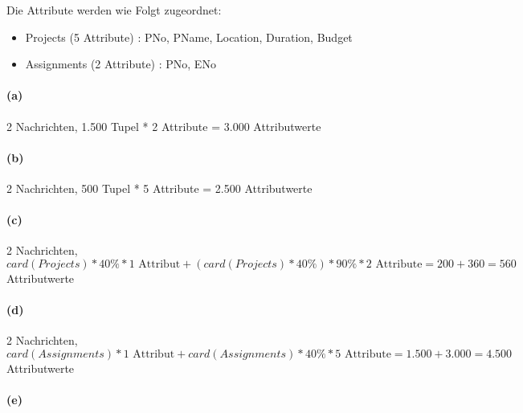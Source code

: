 \documentclass[11pt,a4paper,parskip=half ]{scrartcl}
\begin{document}
	Die Attribute werden wie Folgt zugeordnet:
	\begin{itemize}
		\item Projects (5 Attribute) : PNo, PName, Location, Duration, Budget
		\item Assignments (2 Attribute) : PNo, ENo
	\end{itemize}

\paragraph{(a)}2 Nachrichten, 1.500 Tupel * 2 Attribute = 3.000 Attributwerte
\paragraph{(b)}2 Nachrichten, 500 Tupel * 5 Attribute = 2.500 Attributwerte
\paragraph{(c)}2 Nachrichten, $card(Projects)*40\%*1\text{ Attribut} + (card(Projects)*40\%)*90\%*2\text{ Attribute} = 200 + 360 = 560$ Attributwerte
\paragraph{(d)}2 Nachrichten, $card(Assignments)*1\text{ Attribut} + card(Assignments)*40\%*5\text{ Attribute} = 1.500 + 3.000 = 4.500$ Attributwerte
\paragraph{(e)}
	
\end{document}

